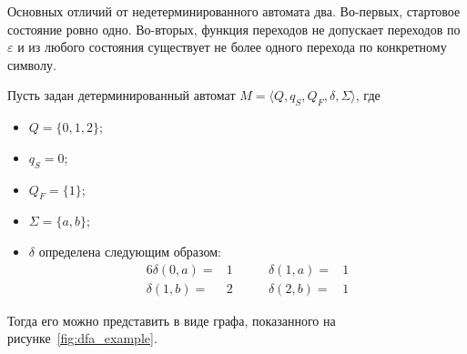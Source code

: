 Основных отличий от недетерминированного автомата два.
Во-первых, стартовое состояние ровно одно.
Во-вторых, функция переходов не допускает переходов по $\varepsilon$ и из любого состояния существует не более одного перехода по конкретному символу.

\begin{example}\label{example:DFA}
    Пусть задан детерминированный автомат $M=\langle Q, q_S, Q_F, \delta, \Sigma\rangle$, где
    \begin{itemize}
        \item $Q = \{0,1,2\}$;
        \item $q_S = 0$;
        \item $Q_F = \{1\}$;
        \item $\Sigma = \{a,b\}$;
        \item $\delta$ определена следующим образом:
        \begin{alignat*}{6}
            \delta(0,a) =& 1      \qquad    & \delta(1,a) =& 1 \\
            \delta(1,b) =& 2      \qquad    & \delta(2,b) =& 1
        \end{alignat*}
    \end{itemize}
    Тогда его можно представить в виде графа, показанного на рисунке~\ref{fig:dfa_example}.
    \begin{marginfigure}
        \begin{center}
        \end{center}
        \caption{Пример детерминированного конечного автомата в котором состояние $0$~--- стартовое, а состояние $1$~--- финальное, задающего тот же язык, что и автомат из примера~\ref{example:NFA}}
        \label{fig:dfa_example}
    \end{marginfigure}

\end{example}

